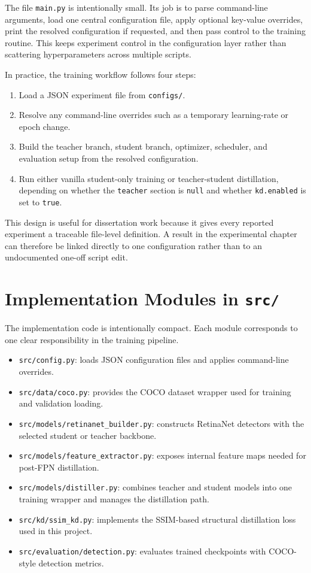 The file \texttt{main.py} is intentionally small. Its job is to parse command-line arguments, load one central configuration file, apply optional key-value overrides, print the resolved configuration if requested, and then pass control to the training routine. This keeps experiment control in the configuration layer rather than scattering hyperparameters across multiple scripts.

In practice, the training workflow follows four steps:

\begin{enumerate}
    \item Load a JSON experiment file from \texttt{configs/}.
    \item Resolve any command-line overrides such as a temporary learning-rate or epoch change.
    \item Build the teacher branch, student branch, optimizer, scheduler, and evaluation setup from the resolved configuration.
    \item Run either vanilla student-only training or teacher-student distillation, depending on whether the \texttt{teacher} section is \texttt{null} and whether \texttt{kd.enabled} is set to \texttt{true}.
\end{enumerate}

This design is useful for dissertation work because it gives every reported experiment a traceable file-level definition. A result in the experimental chapter can therefore be linked directly to one configuration rather than to an undocumented one-off script edit.

\section{Implementation Modules in \texttt{src/}}

The implementation code is intentionally compact. Each module corresponds to one clear responsibility in the training pipeline.

\begin{itemize}
    \item \texttt{src/config.py}: loads JSON configuration files and applies command-line overrides.
    \item \texttt{src/data/coco.py}: provides the COCO dataset wrapper used for training and validation loading.
    \item \texttt{src/models/retinanet\_builder.py}: constructs RetinaNet detectors with the selected student or teacher backbone.
    \item \texttt{src/models/feature\_extractor.py}: exposes internal feature maps needed for post-FPN distillation.
    \item \texttt{src/models/distiller.py}: combines teacher and student models into one training wrapper and manages the distillation path.
    \item \texttt{src/kd/ssim\_kd.py}: implements the SSIM-based structural distillation loss used in this project.
    \item \texttt{src/evaluation/detection.py}: evaluates trained checkpoints with COCO-style detection metrics.
\end{itemize}

